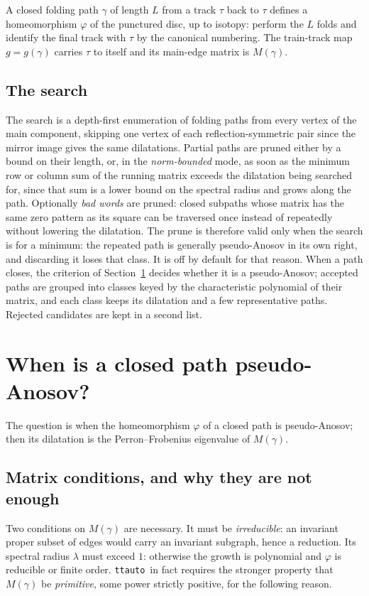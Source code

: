 \documentclass[12pt]{amsart}
\newcommand{\ho}{\varphi}                 %
\newcommand{\trk}{\tau}                   %
\newcommand{\lam}{\lambda}
\newcommand{\ttauto}{\texttt{ttauto}}
\theoremstyle{plain}
\theoremstyle{definition}
\begin{document}
A closed folding path $\gamma$ of length $L$ from a track $\trk$ back to
$\trk$ defines a homeomorphism $\ho$ of the punctured disc, up to
isotopy: perform the $L$ folds and identify the final track with $\trk$
by the canonical numbering.  The train-track map $g=g(\gamma)$ carries
$\trk$ to itself and its main-edge matrix is $M(\gamma)$.

\subsection{The search}
\label{sec:search}
The search is a depth-first enumeration of folding paths from every
vertex of the main component, skipping one vertex of each
reflection-symmetric pair since the mirror image gives the same
dilatations.  Partial paths are pruned either by a bound on their
length, or, in the \emph{norm-bounded} mode, as soon as the minimum row
or column sum of the running matrix exceeds the dilatation being searched
for, since that sum is a lower bound on the spectral radius and grows
along the path.  Optionally \emph{bad words} are pruned: closed subpaths
whose matrix has the same zero pattern as its square can be traversed
once instead of repeatedly without lowering the dilatation.  The prune
is therefore valid only when the search is for a minimum: the repeated
path is generally pseudo-Anosov in its own right, and discarding it
loses that class.  It is off by default for that reason.  When a path
closes, the criterion of Section~\ref{sec:criterion} decides whether it
is a pseudo-Anosov; accepted paths are grouped into classes keyed by the
characteristic polynomial of their matrix, and each class keeps its
dilatation and a few representative paths.  Rejected candidates are kept
in a second list.


\section{When is a closed path pseudo-Anosov?}
\label{sec:criterion}

The question is when the homeomorphism $\ho$ of a closed path is
pseudo-Anosov; then its dilatation is the Perron--Frobenius eigenvalue of
$M(\gamma)$.

\subsection{Matrix conditions, and why they are not enough}
Two conditions on $M(\gamma)$ are necessary.  It must be
\emph{irreducible}: an invariant proper subset of edges would carry an
invariant subgraph, hence a reduction.  Its spectral radius $\lam$ must
exceed $1$: otherwise the growth is polynomial and $\ho$ is reducible or
finite order.  \ttauto\ in fact requires the stronger property that
$M(\gamma)$ be \emph{primitive}, some power strictly positive, for the
following reason.
\end{document}
